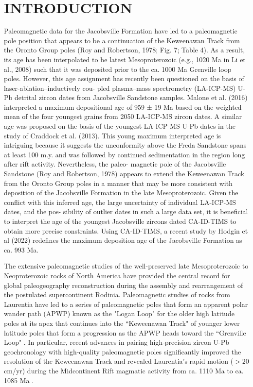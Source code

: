 \documentclass[draft]{agujournal2019}
\begin{document}
\section*{INTRODUCTION}

Paleomagnetic data for the Jacobsville Formation have led to a paleomagnetic pole position that appears to be a continuation of the Keweenawan Track from the Oronto Group poles (Roy and Robertson, 1978; Fig. 7; Table 4). As a result, its age has been interpolated to be latest Mesoproterozoic (e.g., 1020 Ma in Li et al., 2008) such that it was deposited prior to the ca. 1000 Ma Grenville loop poles. However, this age assignment has recently been questioned on the basis of laser-ablation–inductively cou- pled plasma–mass spectrometry (LA-ICP-MS) U-Pb detrital zircon dates from Jacobsville Sandstone samples. Malone et al. (2016) interpreted a maximum depositional age of 959 ± 19 Ma based on the weighted mean of the four youngest grains from 2050 LA-ICP-MS zircon dates. A similar age was proposed on the basis of the youngest LA-ICP-MS U-Pb dates in the study of Craddock et al. (2013). This young maximum interpreted age is intriguing because it suggests the unconformity above the Freda Sandstone spans at least 100 m.y. and was followed by continued sedimentation in the region long after rift activity. Nevertheless, the paleo- magnetic pole of the Jacobsville Sandstone (Roy and Robertson, 1978) appears to extend the Keweenawan Track from the Oronto Group poles in a manner that may be more consistent with deposition of the Jacobsville Formation in the late Mesoproterozoic. Given the conflict with this inferred age, the large uncertainty of individual LA-ICP-MS dates, and the pos- sibility of outlier dates in such a large data set, it is beneficial to interpret the age of the youngest Jacobsville zircons dated CA-ID-TIMS to obtain more precise constraints. Using CA-ID-TIMS, a recent study by Hodgin et al (2022) redefines the maximum deposition age of the Jacobsville Formation as ca. 993 Ma.


The extensive paleomagnetic studies of the well-preserved late Mesoproterozoic to Neoproterozoic rocks of North America have provided the central record for global paleogeography reconstruction during the assembly and rearrangement of the postulated supercontinent Rodinia. Paleomagnetic studies of rocks from Laurentia have led to a series of paleomagnetic poles that form an apparent polar wander path (APWP) known as the "Logan Loop" for the older high latitude poles at its apex that continues into the ``Keweenawan Track" of younger lower latitude poles that form a progression as the APWP heads toward the ``Grenville Loop" \citep{Swanson-Hysell2019a}. In particular, recent advances in pairing high-precision zircon U-Pb geochronology with high-quality paleomagnetic poles significantly improved the resolution of the Keweenawan Track and revealed Laurentia's rapid motion ($>$20 cm/yr) during the Midcontinent Rift magmatic activity from ca. 1110 Ma to ca. 1085 Ma \citep{Swanson-Hysell2019a}. 
\end{document}
